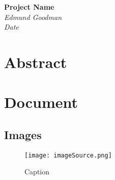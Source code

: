 \documentclass{article}
\begin{document}
\begin{titlepage}
    \vspace*{\fill}
    \begin{center}
        \Huge\textbf{Project Name}\\
        \huge\textit{Edmund Goodman}\\
        \huge\textit{Date}
    \end{center}
    \vspace*{\fill}
\end{titlepage}

\section{Abstract}


\addtocounter{section}{1}
\tableofcontents


\section{Document}
\subsection{Images}
\begin{figure}[h]
    \centering
    \texttt{[image: imageSource.png]}
    \caption{Caption}
    \label{fig:imageReference}
\end{figure}


\addtocounter{section}{1}



\nocite{*}
\end{document}
